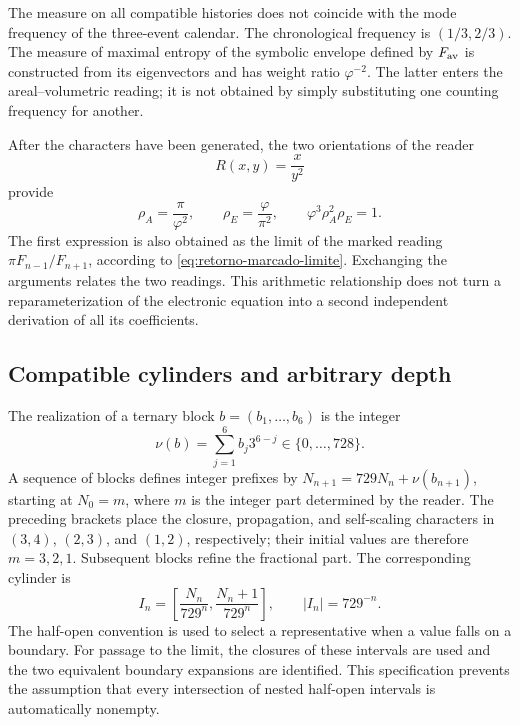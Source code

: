 The measure on all compatible histories does not coincide with the mode frequency of the three-event calendar. The chronological frequency is \((1/3,2/3)\). The measure of maximal entropy of the symbolic envelope defined by \(F_{\rm av}\) is constructed from its eigenvectors and has weight ratio \(\varphi^{-2}\). The latter enters the areal--volumetric reading; it is not obtained by simply substituting one counting frequency for another.



After the characters have been generated, the two orientations of the reader
\[
 R(x,y)=\frac{x}{y^2}
\]
provide
\begin{equation}
 \rho_A=\frac\pi{\varphi^2},\qquad
 \rho_E=\frac\varphi{\pi^2},\qquad
 \varphi^3\rho_A^2\rho_E=1.
 \label{eq:areal-electron}
\end{equation}
The first expression is also obtained as the limit of the marked reading
\(\pi F_{n-1}/F_{n+1}\), according to
\eqref{eq:retorno-marcado-limite}. Exchanging the arguments relates
the two readings. This arithmetic relationship does not turn a
reparameterization of the electronic equation into a second independent
derivation of all its coefficients.




\subsection{Compatible cylinders and arbitrary depth}

The realization of a ternary block \(b=(b_1,\ldots,b_6)\) is the integer
\[
 \nu(b)=\sum_{j=1}^6b_j3^{6-j}\in\{0,\ldots,728\}.
\]
A sequence of blocks defines integer prefixes by \(N_{n+1}=729N_n+\nu(b_{n+1})\), starting at \(N_0=m\), where \(m\) is the integer part determined by the reader. The preceding brackets place the closure, propagation, and self-scaling characters in \((3,4)\), \((2,3)\), and \((1,2)\), respectively; their initial values are therefore \(m=3,2,1\). Subsequent blocks refine the fractional part. The corresponding cylinder is
\begin{equation}
 I_n=\left[\frac{N_n}{729^n},\frac{N_n+1}{729^n}\right],
 \qquad |I_n|=729^{-n}.
 \label{eq:cilindro}
\end{equation}
The half-open convention is used to select a representative when a value falls on a boundary. For passage to the limit, the closures of these intervals are used and the two equivalent boundary expansions are identified. This specification prevents the assumption that every intersection of nested half-open intervals is automatically nonempty.


